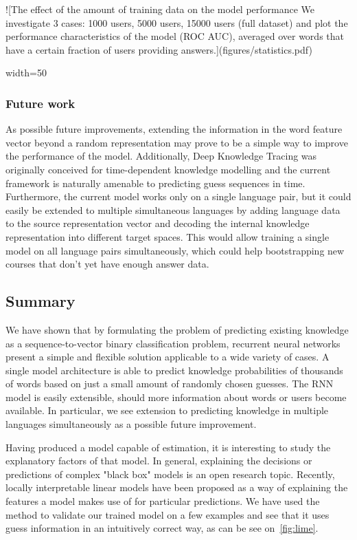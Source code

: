 ![The effect of the amount of training data on the model performance We investigate 3 cases: 1000 users, 5000 users, 15000 users (full dataset) and plot the performance characteristics of the model (ROC AUC), averaged over words that have a certain fraction of users providing answers.\label{fig:statistics}](figures/statistics.pdf){ width=50%

\subsubsection{Future work}

As possible future improvements, extending the information in the word feature vector beyond a random representation may prove to be a simple way to improve the performance of the model. Additionally, Deep Knowledge Tracing was originally conceived for time-dependent knowledge modelling and the current framework is naturally amenable to predicting guess sequences in time. Furthermore, the current model works only on a single language pair, but it could easily be extended to multiple simultaneous languages by adding language data to the source representation vector and decoding the internal knowledge representation into different target spaces. This would allow training a single model on all language pairs simultaneously, which could help bootstrapping new courses that don't yet have enough answer data.

\subsection{Summary}

We have shown that by formulating the problem of predicting existing knowledge as a sequence-to-vector binary classification problem, recurrent neural networks present a simple and flexible solution applicable to a wide variety of cases. A single model architecture is able to predict knowledge probabilities of thousands of words based on just a small amount of randomly chosen guesses. The RNN model is easily extensible, should more information about words or users become available. In particular, we see extension to predicting knowledge in multiple languages simultaneously as a possible future improvement. 

Having produced a model capable of estimation, it is interesting to study the explanatory factors of that model. In general, explaining the decisions or predictions of complex "black box" models is an open research topic. Recently, locally interpretable linear models have been proposed as a way of explaining the features a model makes use of for particular predictions\cite{ribeiro2016should}. We have used the method to validate our trained model on a few examples and see that it uses guess information in an intuitively correct way, as can be see on~\cref{fig:lime}.

}
